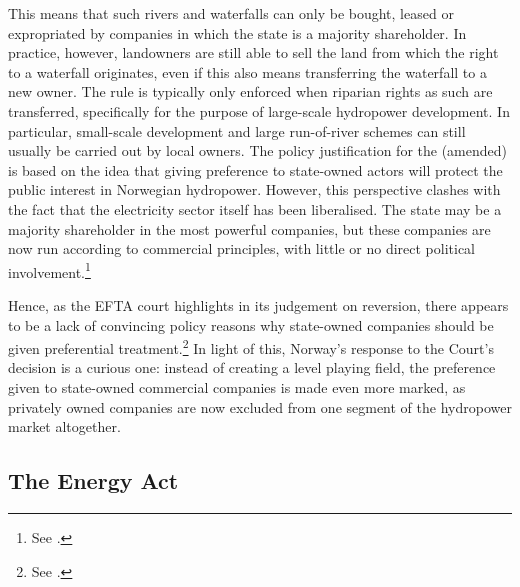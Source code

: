 This means that such rivers and waterfalls can only be bought, leased or expropriated by companies in which the state is a majority shareholder. In practice, however, landowners are still able to sell the land from which the right to a waterfall originates, even if this also means transferring the waterfall to a new owner. The rule is typically only enforced when riparian rights as such are transferred, specifically for the purpose of large-scale hydropower development. In particular, small-scale development and large run-of-river schemes can still usually be carried out by local owners. The policy justification for the (amended) \cite{ica17} is based on the idea that giving preference to state-owned actors will protect the public interest in Norwegian hydropower. However, this perspective clashes with the fact that the electricity sector itself has been liberalised. The state may be a majority shareholder in the most powerful companies, but these companies are now run according to 
commercial principles, with little or no direct political involvement.\footnote{See \cite[86]{efta07}.}

Hence, as the EFTA court highlights in its judgement on reversion, there appears to be a lack of convincing policy reasons why state-owned companies should be given preferential treatment.\footnote{See \cite[84-87]{efta07}.} In light of this, Norway's response to the Court's decision is a curious one: instead of creating a level playing field, the preference given to state-owned commercial companies is made even more marked, as privately owned companies are now excluded from one segment of the hydropower market altogether.


\subsection{The Energy Act}\label{sec:ea}

